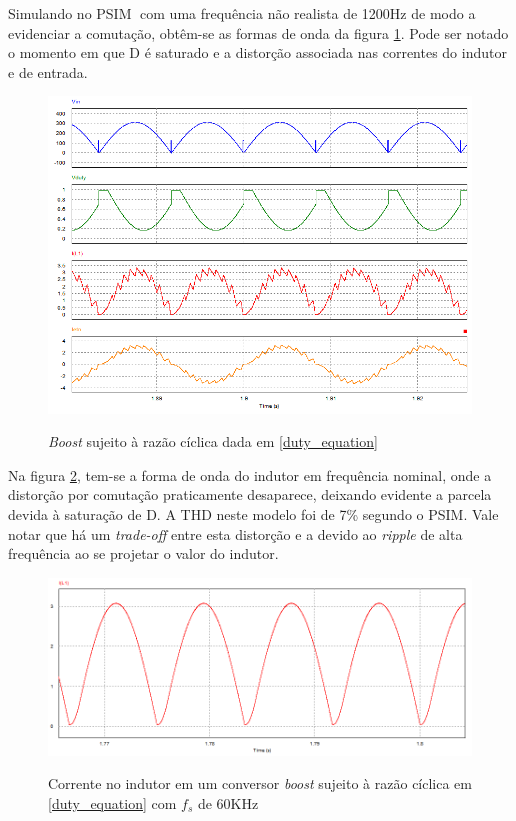 \documentclass[
        12pt,
        openany, %
        oneside, %
        a4paper,			
        english,			
        brazil
        ]{abntbibufjf}
\begin{document}
Simulando no PSIM\textregistered $\;$ com uma frequência não realista de 1200Hz de modo a evidenciar a comutação, obtêm-se as formas de onda da figura \ref{cmc_waves_psim}. Pode ser notado o momento em que D é saturado e a distorção associada nas correntes do indutor e de entrada.

\begin{figure}[!h]
	\centering
	\caption{\textit{Boost} sujeito à razão cíclica dada em \ref{duty_equation}}
	\includegraphics[scale=.5]{../GRAFICOS/PFC_STATIC.png}\\
	\label{cmc_waves_psim}
\end{figure}

Na figura \ref{cmc_waves_psim_2k}, tem-se a forma de onda do indutor em frequência nominal, onde a distorção por comutação praticamente desaparece, deixando evidente a parcela devida à saturação de D. A THD neste modelo foi de 7\% segundo o PSIM\textregistered. Vale notar que há um \textit{trade-off} entre esta distorção e a devido ao \textit{ripple} de alta frequência ao se projetar o valor do indutor.

\begin{figure}[!h]
	\centering
	\caption{Corrente no indutor em um conversor \textit{boost} sujeito à razão cíclica em \ref{duty_equation} com $f_s$ de 60KHz}
	\includegraphics[scale=.4]{../GRAFICOS/PFC_STATIC_20K.png}\\
	\label{cmc_waves_psim_2k}
\end{figure}
\end{document}
